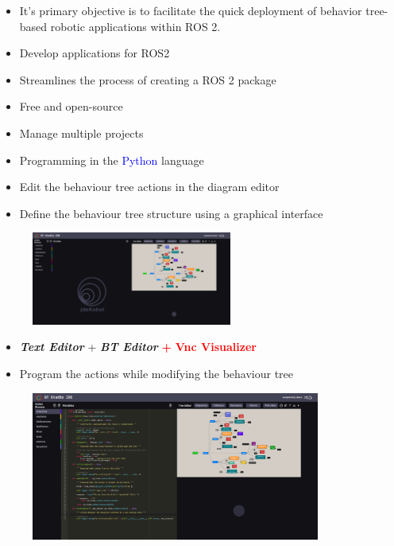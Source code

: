 \documentclass[notes,slidesec,a4]{seminar}
\begin{document}
\begin{hslide}
\begin{itemize}
\item It's primary objective is to facilitate the quick deployment of behavior tree-based robotic applications within ROS 2. 
\item Develop applications for ROS2
\item Streamlines the process of creating a ROS 2 package
\item Free and open-source
\end{itemize}

  \newpage
\begin{itemize}
\item Manage multiple projects
\item Programming in the \textcolor{blue}{Python} language
\item Edit the behaviour tree actions in the diagram editor 
\item Define the behaviour tree structure using a graphical interface
  \end{itemize}
  \begin{figure}
    \centerline{\includegraphics[width=6.6cm]{figs/screenshot1.png}}
  \end{figure}
  
\newpage
{}
\begin{itemize}
  \item \textbf{\textit{Text Editor}} + \textbf{\textit{{BT Editor}}} \textbf{\textcolor{red}{+}} \textbf{\textcolor{red}{Vnc Visualizer}}
  \item Program the actions while modifying the behaviour tree \normalsize

\end{itemize}
  \begin{figure}
    \hspace{1cm}
    \includegraphics[width=9.5cm]{figs/screenshot3.png}
\end{figure}


\end{hslide}
\end{document}
